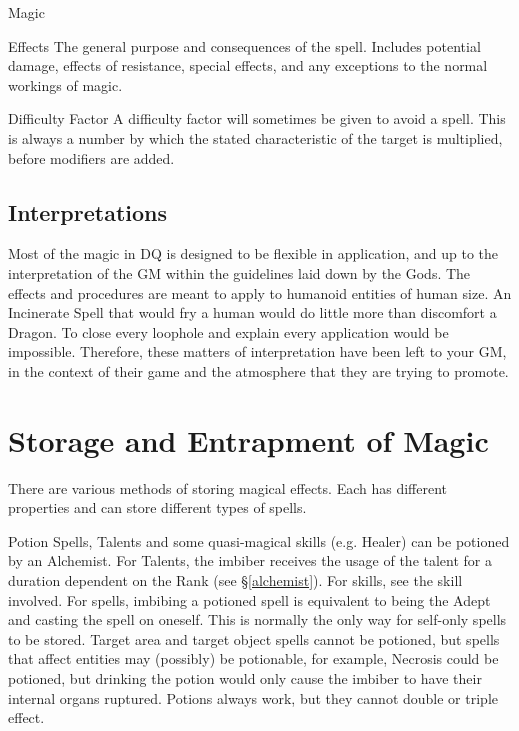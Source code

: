 \begin{Chapter}{Magic}
\begin{Description}
\item[Effects] The general purpose and consequences of the spell.
  Includes potential damage, effects of resistance, special effects,
  and any exceptions to the normal workings of magic.

\item[Difficulty Factor] A difficulty factor will sometimes be given
  to avoid a spell.  This is always a number by which the stated
  characteristic of the target is multiplied, before modifiers are
  added.

\end{Description}
  
\subsection{Interpretations}

Most of the magic in DQ is designed to be flexible in application, and
up to the interpretation of the GM within the guidelines laid down by
the Gods.  The effects and procedures are meant to apply to humanoid
entities of human size.  An Incinerate Spell that would fry a human
would do little more than discomfort a Dragon. To close every loophole
and explain every application would be impossible.  Therefore, these
matters of interpretation have been left to your GM, in the context of
their game and the atmosphere that they are trying to promote.


\section{Storage and Entrapment of Magic}
\label{magic:storage}

There are various methods of storing magical effects.  Each has
different properties and can store different types of spells.

\begin{Description}

\item[Potion] Spells, Talents and some quasi-magical skills (e.g.
  Healer) can be potioned by an Alchemist.  For Talents, the imbiber
  receives the usage of the talent for a duration dependent on the
  Rank (see \S\ref{alchemist}).  For skills, see the skill involved.
  For spells, imbibing a potioned spell is equivalent to being the
  Adept and casting the spell on oneself.  This is normally the only
  way for self-only spells to be stored.  Target area and target
  object spells cannot be potioned, but spells that affect entities
  may (possibly) be potionable, for example, Necrosis could be
  potioned, but drinking the potion would only cause the imbiber to
  have their internal organs ruptured.  Potions always work, but they
  cannot double or triple effect.


\end{Description}
\end{Chapter}
